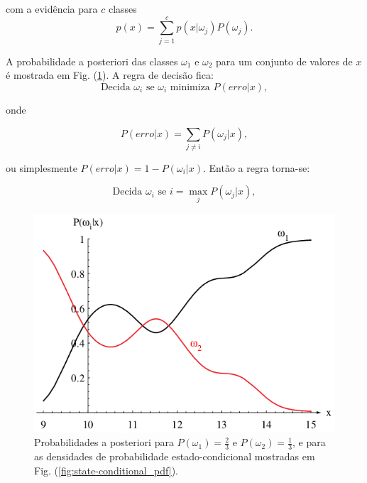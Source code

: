 \documentclass[a4paper,12pt,twocolumn]{article}
\newcommand{\figureref}[1]{Fig. (\ref{fig:#1})}
\begin{document}
\noindent com a evidência para $c$ classes
\begin{equation}
    p(x) = \sum_{j=1}^c p(x|\omega_j)P(\omega_j).
    \label{eq:bayes}
\end{equation}

A probabilidade a posteriori das classes $\omega_1$ e $\omega_2$ para um conjunto de valores de $x$ é mostrada em \figureref{posteriori_prob}. A regra de decisão fica:
\begin{equation}
    \text{Decida } \omega_i \text{ se } \omega_i \text{ minimiza } P(erro|x),
    \label{eq:decision_2}
\end{equation}

\noindent onde

\begin{equation}
    P(erro|x) = \sum_{j\neq i} P(\omega_j|x),
    \label{eq:bayes}
\end{equation}

\noindent ou simplesmente $P(erro|x) = 1 - P(\omega_i|x)$. Então a regra torna-se:

\begin{equation}
    \text{Decida } \omega_i \text{ se } i = \max_j P(\omega_j|x),
    \label{eq:decision_3}
\end{equation}

\begin{figure}[ht]
    \centering
    \includegraphics[scale=0.4]{posteriori_prob}
    \caption{Probabilidades a posteriori para $P(\omega_1) = \frac{2}{3}$ e $P(\omega_2) = \frac{1}{3}$, e para as densidades de probabilidade estado-condicional mostradas em \figureref{state-conditional_pdf}.}
    \label{fig:posteriori_prob}
\end{figure}
\end{document}
